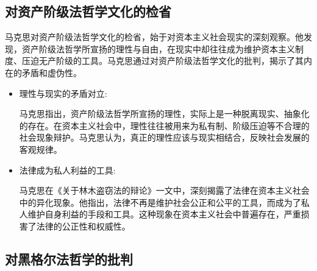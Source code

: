 \documentclass[a4paper]{ctexart}
\begin{document}
\subsection{对资产阶级法哲学文化的检省}

马克思对资产阶级法哲学文化的检省，始于对资本主义社会现实的深刻观察。他发现，资产阶级法哲学所宣扬的理性与自由，在现实中却往往成为维护资本主义制度、压迫无产阶级的工具。马克思通过对资产阶级法哲学文化的批判，揭示了其内在的矛盾和虚伪性。
\begin{itemize}
    \item {\heiti 理性与现实的矛盾对立:}
    
    \qquad 马克思指出，资产阶级法哲学所宣扬的理性，实际上是一种脱离现实、抽象化的存在。在资本主义社会中，理性往往被用来为私有制、阶级压迫等不合理的社会现象辩护。马克思认为，真正的理性应该与现实相结合，反映社会发展的客观规律。

     \item {\heiti 法律成为私人利益的工具:}
    
    \qquad 马克思在《关于林木盗窃法的辩论》一文中，深刻揭露了法律在资本主义社会中的异化现象。他指出，法律不再是维护社会公正和公平的工具，而成为了私人维护自身利益的手段和工具。这种现象在资本主义社会中普遍存在，严重损害了法律的公正性和权威性。

  
\end{itemize}



\subsection{对黑格尔法哲学的批判}
\end{document}
